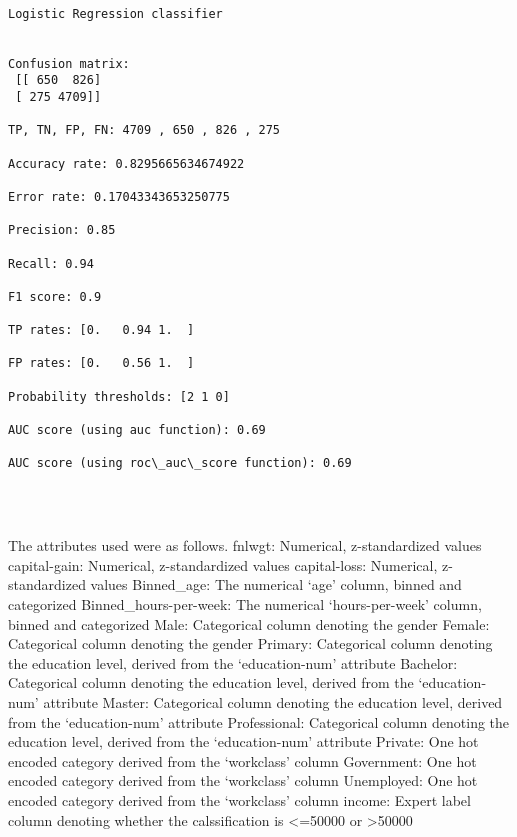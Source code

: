 \documentclass[11pt]{article}
\begin{document}
    \begin{Verbatim}[commandchars=\\\{\}]

Logistic Regression classifier


Confusion matrix:
 [[ 650  826]
 [ 275 4709]]

TP, TN, FP, FN: 4709 , 650 , 826 , 275

Accuracy rate: 0.8295665634674922

Error rate: 0.17043343653250775

Precision: 0.85

Recall: 0.94

F1 score: 0.9

TP rates: [0.   0.94 1.  ]

FP rates: [0.   0.56 1.  ]

Probability thresholds: [2 1 0]

AUC score (using auc function): 0.69

AUC score (using roc\_auc\_score function): 0.69 


    \end{Verbatim}

    \begin{center}
    \end{center}
    { \hspace*{\fill} \\}
    
    The attributes used were as follows. fnlwgt: Numerical, z-standardized
values capital-gain: Numerical, z-standardized values capital-loss:
Numerical, z-standardized values Binned\_age: The numerical `age'
column, binned and categorized Binned\_hours-per-week: The numerical
`hours-per-week' column, binned and categorized Male: Categorical column
denoting the gender Female: Categorical column denoting the gender
Primary: Categorical column denoting the education level, derived from
the `education-num' attribute Bachelor: Categorical column denoting the
education level, derived from the `education-num' attribute Master:
Categorical column denoting the education level, derived from the
`education-num' attribute Professional: Categorical column denoting the
education level, derived from the `education-num' attribute Private: One
hot encoded category derived from the `workclass' column Government: One
hot encoded category derived from the `workclass' column Unemployed: One
hot encoded category derived from the `workclass' column income: Expert
label column denoting whether the calssification is \textless{}=50000 or
\textgreater{}50000
\end{document}
